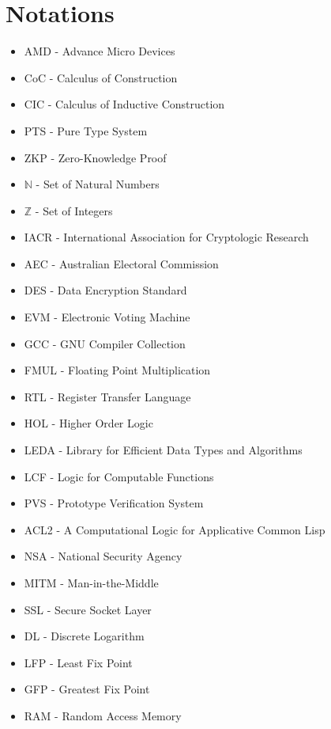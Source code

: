 \chapter*{Notations}


\begin{itemize}
\item AMD - Advance Micro Devices
\item CoC  - Calculus of Construction
\item CIC - Calculus of Inductive Construction
\item PTS - Pure Type System
\item ZKP - Zero-Knowledge Proof
\item $\mathbb{N}$ - Set of Natural Numbers
\item $\mathbb{Z}$ - Set of Integers
\item IACR  - International Association for Cryptologic Research
\item AEC - Australian Electoral Commission
\item DES - Data Encryption Standard
\item EVM - Electronic Voting Machine
\item GCC - GNU Compiler Collection 
\item FMUL - Floating Point Multiplication
\item RTL - Register Transfer Language
\item HOL - Higher Order Logic
\item LEDA - Library for Efficient Data Types and Algorithms
\item LCF - Logic for Computable Functions
\item PVS - Prototype Verification System
\item ACL2 - A Computational Logic for Applicative Common Lisp
\item NSA - National Security Agency
\item MITM - Man-in-the-Middle
\item SSL - Secure Socket Layer
\item DL - Discrete Logarithm
\item LFP - Least Fix Point
\item GFP - Greatest Fix Point
\item RAM - Random Access Memory
\end{itemize}